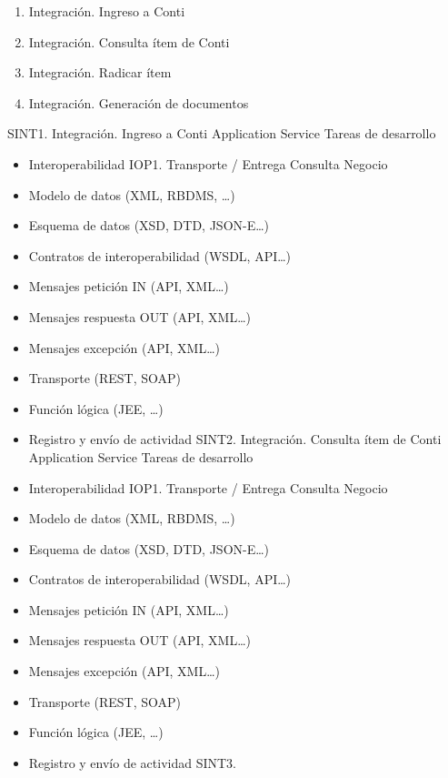 \documentclass[
  paper=a4,
  ,captions=tableheading
]{scrartcl}
\providecommand{\tightlist}{%
  \setlength{\itemsep}{0pt}\setlength{\parskip}{0pt}}
\begin{document}
\begin{enumerate}
\def\labelenumi{\arabic{enumi}.}
\tightlist
\item
  Integración. Ingreso a Conti
\item
  Integración. Consulta ítem de Conti
\item
  Integración. Radicar ítem
\item
  Integración. Generación de documentos
\end{enumerate}

\textbar{} \textbar{} SINT1. Integración. Ingreso a Conti \textbar{}
Application Service \textbar{} Tareas de desarrollo

\begin{itemize}
\item
  Interoperabilidad IOP1. Transporte / Entrega Consulta Negocio
\item
  Modelo de datos (XML, RBDMS, \ldots)
\item
  Esquema de datos (XSD, DTD, JSON-E\ldots)
\item
  Contratos de interoperabilidad (WSDL, API\ldots)
\item
  Mensajes petición IN (API, XML\ldots)
\item
  Mensajes respuesta OUT (API, XML\ldots)
\item
  Mensajes excepción (API, XML\ldots)
\item
  Transporte (REST, SOAP)
\item
  Función lógica (JEE, \ldots)
\item
  Registro y envío de actividad \textbar{} \textbar{} SINT2.
  Integración. Consulta ítem de Conti \textbar{} Application Service
  \textbar{} Tareas de desarrollo
\item
  Interoperabilidad IOP1. Transporte / Entrega Consulta Negocio
\item
  Modelo de datos (XML, RBDMS, \ldots)
\item
  Esquema de datos (XSD, DTD, JSON-E\ldots)
\item
  Contratos de interoperabilidad (WSDL, API\ldots)
\item
  Mensajes petición IN (API, XML\ldots)
\item
  Mensajes respuesta OUT (API, XML\ldots)
\item
  Mensajes excepción (API, XML\ldots)
\item
  Transporte (REST, SOAP)
\item
  Función lógica (JEE, \ldots)
\item
  Registro y envío de actividad \textbar{} \textbar{} SINT3.

\end{itemize}
\end{document}
